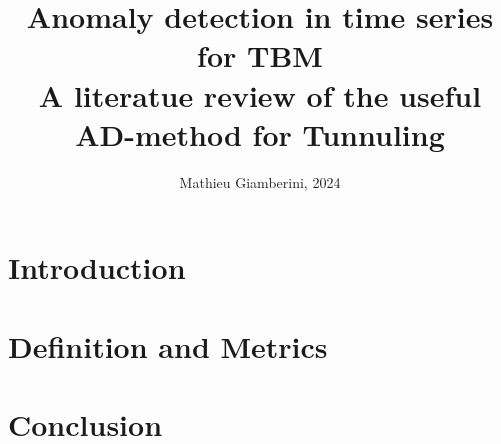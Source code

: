 \documentclass{article}
\title{Anomaly detection in time series for TBM \\ \small{A literatue review of the useful AD-method for Tunnuling}}
\author{Mathieu Giamberini, 2024}
\date{}
\begin{document}
    \maketitle
    \begin{abstract}
        
    \end{abstract}
    
    \section*{Introduction}
    \section{Definition and Metrics}
    
    \section*{Conclusion}
\end{document}
